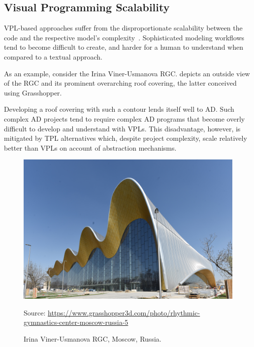 \subsection{Visual Programming Scalability}%
\label{sec:related.ad.vpl-scalability}

\Ac{VPL}-based approaches suffer from the disproportionate scalability between
the code and the respective model's complexity~\cite{Leitao:2013:PESLGD}.
Sophisticated modeling workflows tend to become difficult to create, and harder
for a human to understand when compared to a textual approach.

As an example, consider the Irina Viner-Usmanova \ac{RGC}.
 depicts an outside view of the
\ac{RGC} and its prominent overarching roof covering, the latter conceived using
Grasshopper.

Developing a roof covering with such a contour lends itself well to \ac{AD}.
Such complex \ac{AD} projects tend to require complex \ac{AD} programs that
become overly difficult to develop and understand with \acp{VPL}.  This
disadvantage, however, is mitigated by \ac{TPL} alternatives which, despite
project complexity, scale relatively better than \acp{VPL} on account of
abstraction mechanisms.

\begin{figure}[htbp]
  \includegraphics[width=\linewidth]{fig/rgc}
  \begin{minipage}{\linewidth}
  \scriptsize Source:
  \url{https://www.grasshopper3d.com/photo/rhythmic-gymnastics-center-moscow-russia-5}
  \end{minipage}
  \caption[\acl{RGC} in the Luzhniki Complex]{
    Irina Viner-Usmanova \ac{RGC}, Moscow, Russia.}%
  \label{fig:related.ad.vpl-scalability.rgc}
\end{figure}
